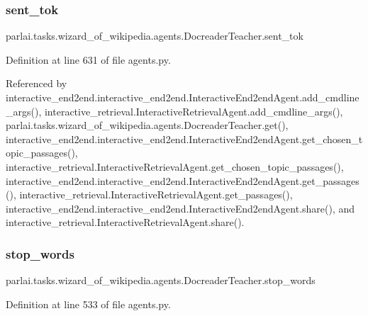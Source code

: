 \subsubsection{\texorpdfstring{sent\+\_\+tok}{sent\_tok}}
{\footnotesize\ttfamily parlai.\+tasks.\+wizard\+\_\+of\+\_\+wikipedia.\+agents.\+Docreader\+Teacher.\+sent\+\_\+tok}



Definition at line 631 of file agents.\+py.



Referenced by interactive\+\_\+end2end.\+interactive\+\_\+end2end.\+Interactive\+End2end\+Agent.\+add\+\_\+cmdline\+\_\+args(), interactive\+\_\+retrieval.\+Interactive\+Retrieval\+Agent.\+add\+\_\+cmdline\+\_\+args(), parlai.\+tasks.\+wizard\+\_\+of\+\_\+wikipedia.\+agents.\+Docreader\+Teacher.\+get(), interactive\+\_\+end2end.\+interactive\+\_\+end2end.\+Interactive\+End2end\+Agent.\+get\+\_\+chosen\+\_\+topic\+\_\+passages(), interactive\+\_\+retrieval.\+Interactive\+Retrieval\+Agent.\+get\+\_\+chosen\+\_\+topic\+\_\+passages(), interactive\+\_\+end2end.\+interactive\+\_\+end2end.\+Interactive\+End2end\+Agent.\+get\+\_\+passages(), interactive\+\_\+retrieval.\+Interactive\+Retrieval\+Agent.\+get\+\_\+passages(), interactive\+\_\+end2end.\+interactive\+\_\+end2end.\+Interactive\+End2end\+Agent.\+share(), and interactive\+\_\+retrieval.\+Interactive\+Retrieval\+Agent.\+share().

\mbox{\label{classparlai_1_1tasks_1_1wizard__of__wikipedia_1_1agents_1_1DocreaderTeacher_a3f6ba852ce8621883a21c1f4fadb9814}} 
\subsubsection{\texorpdfstring{stop\+\_\+words}{stop\_words}}
{\footnotesize\ttfamily parlai.\+tasks.\+wizard\+\_\+of\+\_\+wikipedia.\+agents.\+Docreader\+Teacher.\+stop\+\_\+words}



Definition at line 533 of file agents.\+py.



